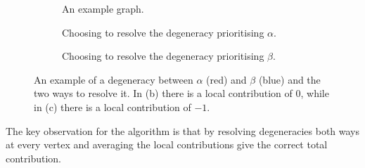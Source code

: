 \documentclass[12pt]{report}
\theoremstyle{upright}
\begin{document}
\begin{figure}[h]
	\centering
	\hspace*{\fill}
	\begin{subfigure}[b]{0.4 \textwidth}
	\centering
	\def\svgscale{0.7}
	
	\caption{An example graph.}
	\label{fig:int-num-graph}
	\end{subfigure}
	\hspace*{\fill}
	\begin{subfigure}[b]{0.25 \textwidth}
		\centering
		\def\svgscale{0.6}
		
		\caption{Choosing to resolve the degeneracy prioritising $\alpha$.}
		\label{fig:res-int-num-red}
	\end{subfigure}
	\hspace*{\fill}
	\begin{subfigure}[b]{0.25 \textwidth}
		\centering
		\def\svgscale{0.6}
		
		\caption{Choosing to resolve the degeneracy prioritising $\beta$.}
		\label{fig:res-int-num-blue}
	\end{subfigure}
	\hspace*{\fill} 
	\caption{An example of a degeneracy between $\alpha$ (red) and $\beta$ (blue) and the two ways to resolve it. In (b) there is a local contribution of $0$, while in (c) there is a local contribution of $-1$.}
	\label{fig:intersection-number-graph}
\end{figure}

The key observation for the algorithm is that by resolving degeneracies both ways at every vertex and averaging the local contributions give the correct total contribution.
\end{document}
